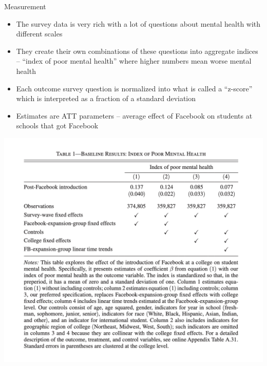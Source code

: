 \documentclass{beamer}
\begin{document}
\begin{frame}{Measurement}

\begin{itemize}
\item The survey data is very rich with a lot of questions about mental health with different scales
\item They create their own combinations of these questions into aggregate indices -- ``index of poor mental health'' where higher numbers mean worse mental health
\item Each outcome survey question is normalized into what is called a ``z-score'' which is interpreted as a fraction of a standard deviation
\item Estimates are ATT parameters -- average effect of Facebook on students at schools that got Facebook
\end{itemize}

\end{frame}


\begin{frame}
\begin{center}
\includegraphics[scale=0.35]{./lecture_includes/facebook_1}
\end{center}
\end{frame}
\end{document}
